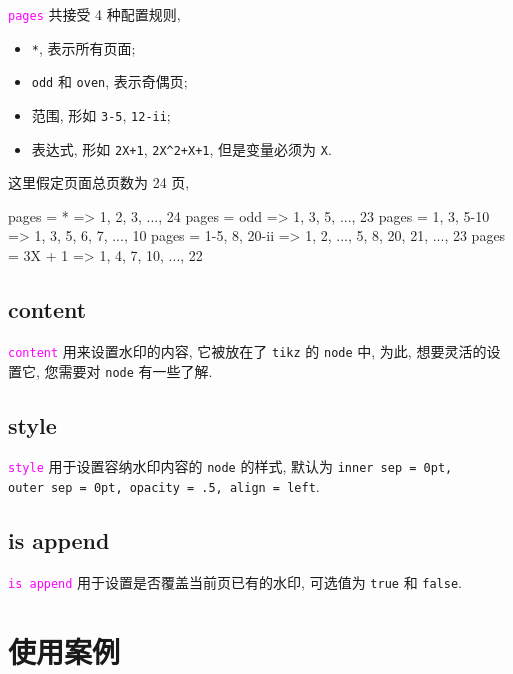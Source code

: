 \documentclass{article}
\newcounter{example}
\def\opt#1{\textcolor{magenta}{\texttt{#1}}}
\def\para#1{\textcolor[rgb]{0.13, 0.67, 0.8}{\texttt{#1}}}
\begin{document}
\opt{pages} 共接受 4 种配置规则, 
\begin{itemize}
  \item \para{*}, 表示所有页面;
  \item \para{odd} 和 \para{oven}, 表示奇偶页;
  \item 范围, 形如 \para{3-5}, \para{12-ii};
  \item 表达式, 形如 \para{2X+1}, \para{2X\^{}2+X+1}, 但是变量必须为 \para{X}.
\end{itemize}

这里假定页面总页数为 24 页, 
\begin{example}[title = pages 配置规则]
pages = {*}              =>     1, 2, 3, ..., 24
pages = {odd}            =>     1, 3, 5, ..., 23
pages = {1, 3, 5-10}     =>     1, 3, 5, 6, 7, ..., 10
pages = {1-5, 8, 20-ii}  =>     1, 2, ..., 5, 8, 20, 21, ..., 23
pages = {3X + 1}         =>     1, 4, 7, 10, ..., 22
\end{example}

\subsection{content}
\opt{content} 用来设置水印的内容, 它被放在了 \texttt{tikz} 的 \texttt{node} 中, 为此, 想要灵活的设置它, 您需要对 \texttt{node} 有一些了解.

\subsection{style}
\opt{style} 用于设置容纳水印内容的 \texttt{node} 的样式, 默认为 \para{inner~sep = 0pt, outer~sep = 0pt, opacity = .5, align = left}.

\subsection{is append}
\opt{is append} 用于设置是否覆盖当前页已有的水印, 可选值为 \para{true} 和 \para{false}.

\section{使用案例}
\begin{example}[title = 为所有页面右上角添加页码]
\end{example}

\begin{example}[title = 为偶数页页面中心添加文字 Watermark]
\end{example}

\begin{example}[title = 为第二页到最后一页设置铺满整个页面的文字]
\end{example}
\end{document}
